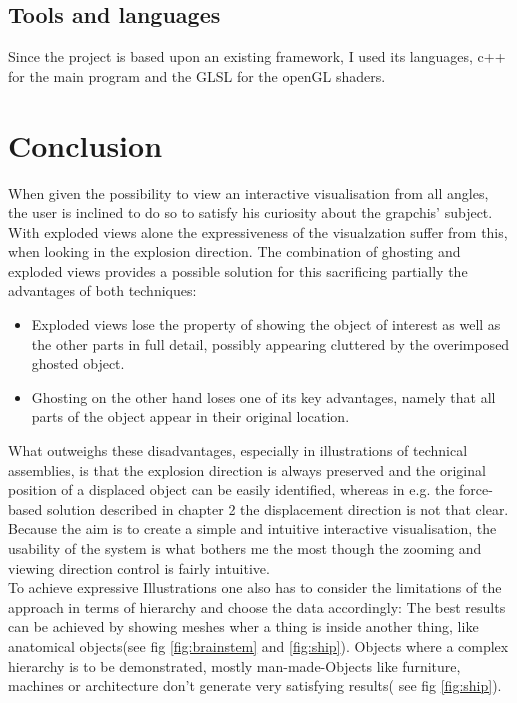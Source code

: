 \section {Tools and languages}
Since the project is based upon an existing framework, I used its languages, c++ for the main program and the GLSL for the openGL shaders.
\chapter{Conclusion}
When given the possibility to view an interactive visualisation from all angles, the user is inclined to do so to satisfy his curiosity about the grapchis' subject. With exploded views alone the expressiveness of the visualzation suffer from this, when looking in the explosion direction. The combination of ghosting and exploded views provides a possible solution for this sacrificing partially the advantages of both techniques:
\begin{itemize}
\item Exploded views lose the property of showing the object of interest as well as the other parts in full detail, possibly appearing cluttered by the overimposed ghosted object.
\item Ghosting on the other hand loses one of its key advantages, namely that all parts of the object appear in their original location.
\end{itemize}
What outweighs these disadvantages, especially in illustrations of technical assemblies, is that the explosion direction is always preserved and the original position of a displaced object can be easily identified, whereas in e.g. the force-based solution described in chapter 2 the displacement direction is not that clear.\\
Because the aim is to create a simple and intuitive interactive visualisation, the usability of the system is what bothers me the most though the zooming and viewing direction control is fairly intuitive.\\
To achieve expressive Illustrations one also has to consider the limitations of the approach in terms of hierarchy and choose the data accordingly: The best results can be achieved by showing meshes wher a thing is inside another thing, like anatomical objects(see fig \ref{fig:brainstem} and \ref{fig:ship}). Objects where a complex hierarchy is to be demonstrated, mostly man-made-Objects like furniture, machines or architecture don't generate very satisfying results( see fig \ref{fig:ship}).
